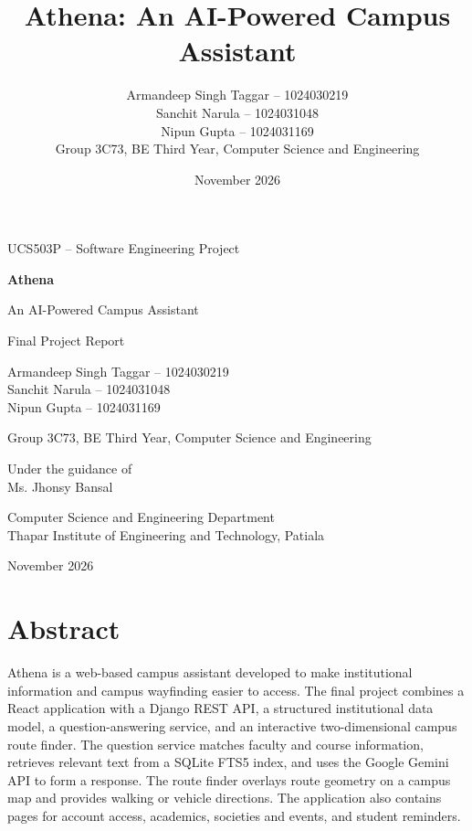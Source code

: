 \documentclass[11pt,a4paper]{report}
\title{Athena: An AI-Powered Campus Assistant}
\author{Armandeep Singh Taggar -- 1024030219\\
  Sanchit Narula -- 1024031048\\
  Nipun Gupta -- 1024031169\\[0.7em]
  Group 3C73, BE Third Year, Computer Science and Engineering}
\date{November 2026}
\begin{document}
\begin{titlepage}
  \centering
  {\large UCS503P -- Software Engineering Project\par}
  \vspace{1.8cm}
  {\Huge\bfseries Athena\par}
  \vspace{0.45cm}
  {\Large An AI-Powered Campus Assistant\par}
  \vspace{1.5cm}
  {\large Final Project Report\par}
  \vspace{1.1cm}
  {\large Armandeep Singh Taggar -- 1024030219\\[0.2em]
    Sanchit Narula -- 1024031048\\[0.2em]
    Nipun Gupta -- 1024031169\par}
  \vspace{0.5cm}
  {Group 3C73, BE Third Year, Computer Science and Engineering\par}
  \vspace{1cm}
  {Under the guidance of\\[0.2em]
    \large Ms. Jhonsy Bansal\par}
  \vfill
  {\large Computer Science and Engineering Department\\
    Thapar Institute of Engineering and Technology, Patiala\par}
  \vspace{0.45cm}
  {November 2026\par}
\end{titlepage}

\chapter*{Abstract}
Athena is a web-based campus assistant developed to make institutional
information and campus wayfinding easier to access. The final project combines
a React application with a Django REST API, a structured institutional data
model, a question-answering service, and an interactive two-dimensional campus
route finder. The question service matches faculty and course information,
retrieves relevant text from a SQLite FTS5 index, and uses the Google Gemini
API to form a response. The route finder overlays route geometry on a campus
map and provides walking or vehicle directions. The application also contains
pages for account access, academics, societies and events, and student
reminders.
\end{document}
